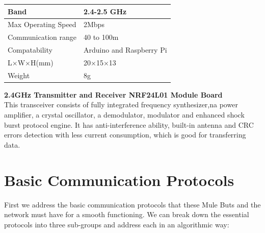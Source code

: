 \documentclass{article}
\begin{document}
\begin{center}
       \begin{tabular}{|l|l|}
            \hline
            Band & 2.4-2.5 GHz\\
            \hline
            Max Operating Speed & 2Mbps\\
            \hline
            Communication range & 40 to 100m\\
            \hline
            Compatability & Arduino and Raspberry Pi\\
            \hline
             L$\times$W$\times$H(mm) & 20$\times$15$\times$13\\
            \hline
            Weight & 8g\\
            \hline
            \end{tabular}
            \end{center}
\textbf{2.4GHz Transmitter and Receiver NRF24L01 Module Board}
\\
This transceiver consists of fully integrated frequency synthesizer,na power amplifier, a crystal oscillator, a demodulator, modulator and enhanced shock burst protocol engine. It has anti-interference ability, built-in antenna and CRC errors detection with less current consumption, which is good for transferring data.

\section{Basic Communication Protocols}
First we address the basic communication protocols that these Mule Buts and the network must have for a smooth functioning. We can break down the essential protocols into three sub-groups and address each in an algorithmic way:
\end{document}
